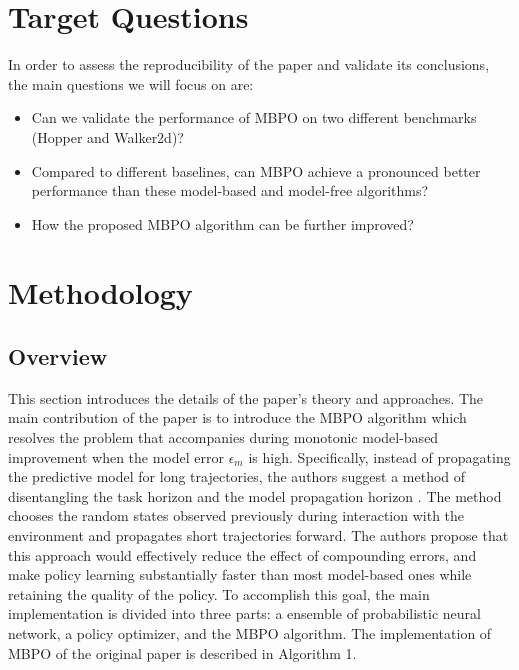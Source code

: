 \documentclass{article}
\begin{document}
\section{Target Questions}
In order to assess the reproducibility of the paper and validate its conclusions, the main questions we will focus on are:
\begin{itemize}
    \item Can we validate the performance of MBPO on two different benchmarks \cite{ref4} (Hopper and Walker2d)?
    \item Compared to different baselines, can MBPO achieve a pronounced better performance than these model-based and model-free algorithms?
    \item How the proposed MBPO algorithm can be further improved?
\end{itemize}

\section{Methodology}

\subsection{Overview}
This section introduces the details of the paper's theory and approaches. The main contribution of the paper is to introduce the MBPO algorithm which resolves the problem that accompanies during monotonic model-based improvement when the model error $\epsilon_m$ is high. Specifically, instead of propagating the predictive model for long trajectories, the authors suggest a method of disentangling the task horizon and the model propagation horizon \cite{ref5}. The method chooses the random states observed previously during interaction with the environment and propagates short trajectories forward. The authors propose that this approach would effectively reduce the effect of compounding errors, and make policy learning substantially faster than most model-based ones while retaining the quality of the policy. To accomplish this goal, the main implementation is divided into three parts: a ensemble of probabilistic neural network, a policy optimizer, and the MBPO algorithm. The implementation of MBPO of the original paper is described in Algorithm 1.
\end{document}
